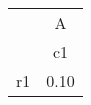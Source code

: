 \begin{tabular}{l*{1}{c}}
\hline\hline
            &           A\\
            &          c1\\
\hline
r1          &        0.10\\
\hline\hline
\end{tabular}
